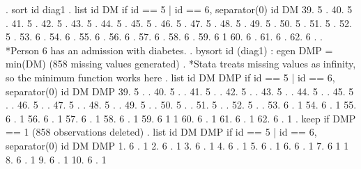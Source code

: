 . sort id diag1
{\smallskip}
. list id DM if id == 5 | id == 6, separator(0)
{\smallskip}
      {\TLC}
      {\VBAR} id   DM {\VBAR}
      {\LFTT}
  39. {\VBAR}  5    . {\VBAR}
  40. {\VBAR}  5    . {\VBAR}
  41. {\VBAR}  5    . {\VBAR}
  42. {\VBAR}  5    . {\VBAR}
  43. {\VBAR}  5    . {\VBAR}
  44. {\VBAR}  5    . {\VBAR}
  45. {\VBAR}  5    . {\VBAR}
  46. {\VBAR}  5    . {\VBAR}
  47. {\VBAR}  5    . {\VBAR}
  48. {\VBAR}  5    . {\VBAR}
  49. {\VBAR}  5    . {\VBAR}
  50. {\VBAR}  5    . {\VBAR}
  51. {\VBAR}  5    . {\VBAR}
  52. {\VBAR}  5    . {\VBAR}
  53. {\VBAR}  6    . {\VBAR}
  54. {\VBAR}  6    . {\VBAR}
  55. {\VBAR}  6    . {\VBAR}
  56. {\VBAR}  6    . {\VBAR}
  57. {\VBAR}  6    . {\VBAR}
  58. {\VBAR}  6    . {\VBAR}
  59. {\VBAR}  6    1 {\VBAR}
  60. {\VBAR}  6    . {\VBAR}
  61. {\VBAR}  6    . {\VBAR}
  62. {\VBAR}  6    . {\VBAR}
      {\BLC}
{\smallskip}
. *Person 6 has an admission with diabetes. 
. bysort id (diag1) : egen DMP = min(DM)
(858 missing values generated)
{\smallskip}
. *Stata treats missing values as infinity, so the minimum function works here
. list id DM DMP if id == 5 | id == 6, separator(0)
{\smallskip}
      {\TLC}
      {\VBAR} id   DM   DMP {\VBAR}
      {\LFTT}
  39. {\VBAR}  5    .     . {\VBAR}
  40. {\VBAR}  5    .     . {\VBAR}
  41. {\VBAR}  5    .     . {\VBAR}
  42. {\VBAR}  5    .     . {\VBAR}
  43. {\VBAR}  5    .     . {\VBAR}
  44. {\VBAR}  5    .     . {\VBAR}
  45. {\VBAR}  5    .     . {\VBAR}
  46. {\VBAR}  5    .     . {\VBAR}
  47. {\VBAR}  5    .     . {\VBAR}
  48. {\VBAR}  5    .     . {\VBAR}
  49. {\VBAR}  5    .     . {\VBAR}
  50. {\VBAR}  5    .     . {\VBAR}
  51. {\VBAR}  5    .     . {\VBAR}
  52. {\VBAR}  5    .     . {\VBAR}
  53. {\VBAR}  6    .     1 {\VBAR}
  54. {\VBAR}  6    .     1 {\VBAR}
  55. {\VBAR}  6    .     1 {\VBAR}
  56. {\VBAR}  6    .     1 {\VBAR}
  57. {\VBAR}  6    .     1 {\VBAR}
  58. {\VBAR}  6    .     1 {\VBAR}
  59. {\VBAR}  6    1     1 {\VBAR}
  60. {\VBAR}  6    .     1 {\VBAR}
  61. {\VBAR}  6    .     1 {\VBAR}
  62. {\VBAR}  6    .     1 {\VBAR}
      {\BLC}
{\smallskip}
. keep if DMP == 1
(858 observations deleted)
{\smallskip}
. list id DM DMP if id == 5 | id == 6, separator(0)
{\smallskip}
     {\TLC}
     {\VBAR} id   DM   DMP {\VBAR}
     {\LFTT}
  1. {\VBAR}  6    .     1 {\VBAR}
  2. {\VBAR}  6    .     1 {\VBAR}
  3. {\VBAR}  6    .     1 {\VBAR}
  4. {\VBAR}  6    .     1 {\VBAR}
  5. {\VBAR}  6    .     1 {\VBAR}
  6. {\VBAR}  6    .     1 {\VBAR}
  7. {\VBAR}  6    1     1 {\VBAR}
  8. {\VBAR}  6    .     1 {\VBAR}
  9. {\VBAR}  6    .     1 {\VBAR}
 10. {\VBAR}  6    .     1 {\VBAR}
     {\BLC}
{\smallskip}
